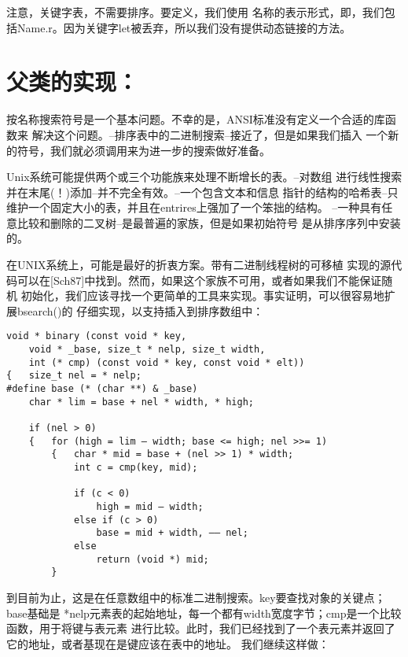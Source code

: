     注意，关键字表，不需要排序。要定义，我们使用
名称的表示形式，即，我们包括Name.r。因为关键字let被丢弃，所以我们没有提供动态链接的方法。

\section{父类的实现：}
    按名称搜索符号是一个基本问题。不幸的是，ANSI标准没有定义一个合适的库函数来
解决这个问题。--排序表中的二进制搜索--接近了，但是如果我们插入
一个新的符号，我们就必须调用来为进一步的搜索做好准备。
    
    Unix系统可能提供两个或三个功能族来处理不断增长的表。--对数组
进行线性搜索并在末尾(！)添加--并不完全有效。--一个包含文本和信息
指针的结构的哈希表--只维护一个固定大小的表，并且在entrires上强加了一个笨拙的结构。
--一种具有任意比较和删除的二叉树--是最普遍的家族，但是如果初始符号
是从排序序列中安装的。

    在UNIX系统上，可能是最好的折衷方案。带有二进制线程树的可移植
实现的源代码可以在[Sch87]中找到。然而，如果这个家族不可用，或者如果我们不能保证随机
初始化，我们应该寻找一个更简单的工具来实现。事实证明，可以很容易地扩展bsearch()的
仔细实现，以支持插入到排序数组中：
\begin{lstlisting}
void * binary (const void * key, 
    void * _base, size_t * nelp, size_t width, 
    int (* cmp) (const void * key, const void * elt)) 
{   size_t nel = * nelp; 
#define base (* (char **) & _base) 
    char * lim = base + nel * width, * high; 
    
    if (nel > 0) 
    {   for (high = lim — width; base <= high; nel >>= 1) 
        {   char * mid = base + (nel >> 1) * width; 
            int c = cmp(key, mid); 
            
            if (c < 0) 
                high = mid — width; 
            else if (c > 0) 
                base = mid + width, —— nel; 
            else 
                return (void *) mid; 
        }
\end{lstlisting}

    到目前为止，这是在任意数组中的标准二进制搜索。key要查找对象的关键点；base基础是
*nelp元素表的起始地址，每一个都有width宽度字节；cmp是一个比较函数，用于将键与表元素
进行比较。此时，我们已经找到了一个表元素并返回了它的地址，或者基现在是键应该在表中的地址。
我们继续这样做：


